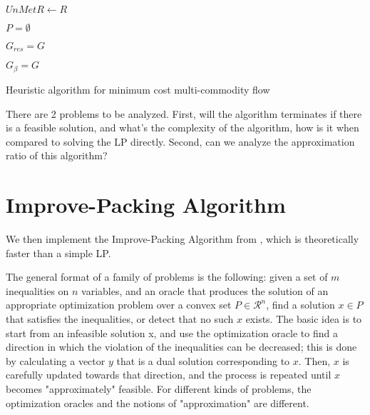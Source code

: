 \documentclass[a4paper]{article}
\begin{document}
\begin{algorithm}
\DontPrintSemicolon %
$UnMetR\leftarrow R$

$P=\emptyset$


$G_{res}=G$

$G_{\beta}=G$

\;
\caption{{\sc Heuristic} algorithm for minimum cost multi-commodity flow }
\label{algo:max}
\end{algorithm}


There are 2 problems to be analyzed. First, will the algorithm terminates if there is a feasible solution, and what's the complexity of the algorithm, how is it when compared to solving the LP directly. Second, can we analyze the approximation ratio of this algorithm?


\section{Improve-Packing Algorithm}
We then implement the Improve-Packing Algorithm from \cite{garg2007faster}, which is theoretically faster than a simple LP.

The general format of a family of problems is the following: given a set of $m$ inequalities on $n$ variables, and an oracle that produces the solution of an appropriate optimization problem over a convex set $P \in \mathcal{R}^n$, find a solution $x \in P$ that satisfies the inequalities, or detect that no such $x$ exists. The basic idea is to start from an infeasible solution x, and use the optimization oracle to find a direction in which the violation of the inequalities can be decreased; this is done by calculating a vector $y$ that is a dual solution corresponding to $x$. Then, $x$ is carefully updated towards that direction, and the process is repeated until $x$ becomes "approximately" feasible. For different kinds of problems, the optimization oracles and the notions of "approximation" are different.
\end{document}
